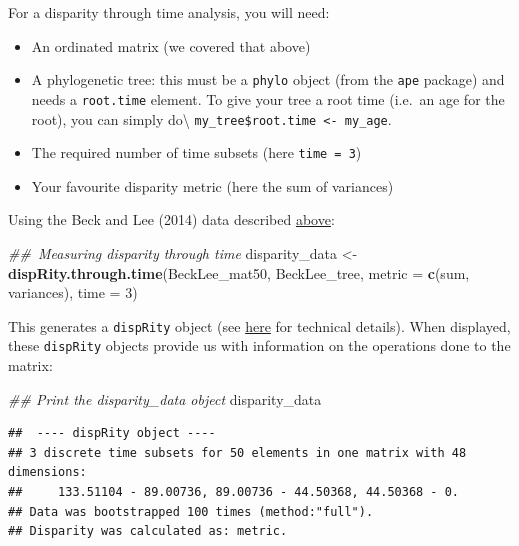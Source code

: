 \documentclass[]{book}
\newenvironment{Shaded}{\begin{snugshade}}{\end{snugshade}}
\newcommand{\CommentTok}[1]{\textcolor[rgb]{0.56,0.35,0.01}{\textit{#1}}}
\newcommand{\DataTypeTok}[1]{\textcolor[rgb]{0.13,0.29,0.53}{#1}}
\newcommand{\DecValTok}[1]{\textcolor[rgb]{0.00,0.00,0.81}{#1}}
\newcommand{\KeywordTok}[1]{\textcolor[rgb]{0.13,0.29,0.53}{\textbf{#1}}}
\newcommand{\NormalTok}[1]{#1}
\newcommand{\StringTok}[1]{\textcolor[rgb]{0.31,0.60,0.02}{#1}}
\providecommand{\tightlist}{%
  \setlength{\itemsep}{0pt}\setlength{\parskip}{0pt}}
\begin{document}
For a disparity through time analysis, you will need:

\begin{itemize}
\tightlist
\item
  An ordinated matrix (we covered that above)
\item
  A phylogenetic tree: this must be a \texttt{phylo} object (from the \texttt{ape} package) and needs a \texttt{root.time} element. To give your tree a root time (i.e.~an age for the root), you can simply do\textbackslash{} \texttt{my\_tree\$root.time\ \textless{}-\ my\_age}.
\item
  The required number of time subsets (here \texttt{time\ =\ 3})
\item
  Your favourite disparity metric (here the sum of variances)
\end{itemize}

Using the Beck and Lee (2014) data described \protect\hyperlink{example-data}{above}:

\begin{Shaded}
\begin{Highlighting}[]
\CommentTok{## Measuring disparity through time}
\NormalTok{disparity_data <-}\StringTok{ }\KeywordTok{dispRity.through.time}\NormalTok{(BeckLee_mat50, BeckLee_tree,}
                                        \DataTypeTok{metric =} \KeywordTok{c}\NormalTok{(sum, variances),}
                                        \DataTypeTok{time =} \DecValTok{3}\NormalTok{)}
\end{Highlighting}
\end{Shaded}

This generates a \texttt{dispRity} object (see \protect\hyperlink{guts}{here} for technical details).
When displayed, these \texttt{dispRity} objects provide us with information on the operations done to the matrix:

\begin{Shaded}
\begin{Highlighting}[]
\CommentTok{## Print the disparity_data object}
\NormalTok{disparity_data}
\end{Highlighting}
\end{Shaded}

\begin{verbatim}
##  ---- dispRity object ---- 
## 3 discrete time subsets for 50 elements in one matrix with 48 dimensions:
##     133.51104 - 89.00736, 89.00736 - 44.50368, 44.50368 - 0.
## Data was bootstrapped 100 times (method:"full").
## Disparity was calculated as: metric.
\end{verbatim}
\end{document}
